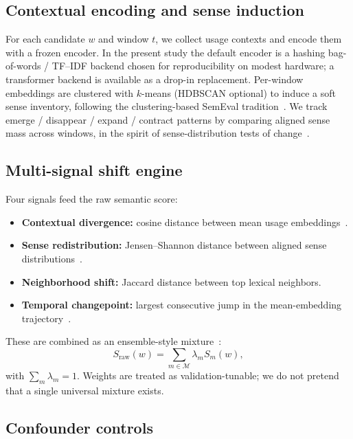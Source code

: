 \documentclass{llncs}
\begin{document}
\subsection{Contextual encoding and sense induction}
For each candidate $w$ and window $t$, we collect usage contexts and encode them with a frozen encoder.
In the present study the default encoder is a hashing bag-of-words / TF--IDF backend chosen for reproducibility on modest hardware; a transformer backend is available as a drop-in replacement.
Per-window embeddings are clustered with $k$-means (HDBSCAN optional) to induce a soft sense inventory, following the clustering-based SemEval tradition~\cite{cuba2020sensecluster,rother2020cmce}.
We track emerge / disappear / expand / contract patterns by comparing aligned sense mass across windows, in the spirit of sense-distribution tests of change~\cite{tang2023cansense,arefyev2020bos}.

\subsection{Multi-signal shift engine}
Four signals feed the raw semantic score:
\begin{itemize}
\item \textbf{Contextual divergence:} cosine distance between mean usage embeddings~\cite{beck2020diasense,martinc2020discovery}.
\item \textbf{Sense redistribution:} Jensen--Shannon distance between aligned sense distributions~\cite{tang2023cansense}.
\item \textbf{Neighborhood shift:} Jaccard distance between top lexical neighbors.
\item \textbf{Temporal changepoint:} largest consecutive jump in the mean-embedding trajectory~\cite{zhou2020temporalteller,periti2023studying}.
\end{itemize}
These are combined as an ensemble-style mixture~\cite{gruppi2020schme,ansari2026rtlsdr}:
\begin{equation}
S_{\mathrm{raw}}(w)=\sum_{m\in\mathcal{M}} \lambda_m S_m(w),
\end{equation}
with $\sum_m \lambda_m=1$.
Weights are treated as validation-tunable; we do not pretend that a single universal mixture exists.

\subsection{Confounder controls}
\end{document}
